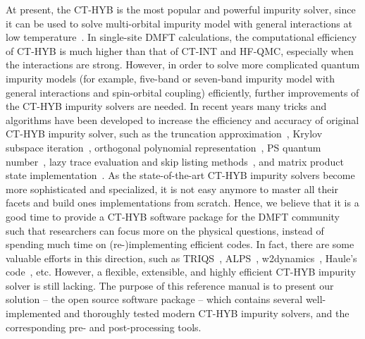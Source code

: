 At present, the CT-HYB is the most popular and powerful impurity solver, since it can be used to solve multi-orbital impurity model with general interactions at low temperature~\cite{RevModPhys.83.349}. In single-site DMFT calculations, the computational efficiency of CT-HYB is much higher than that of CT-INT and HF-QMC, especially when the interactions are  strong. However, in order to solve more complicated quantum impurity models (for example, five-band or seven-band impurity model with general interactions and spin-orbital coupling) efficiently, further improvements of the CT-HYB impurity solvers are needed. In recent years many tricks and algorithms have been developed to increase the efficiency and accuracy of original CT-HYB impurity solver, such as the truncation approximation~\cite{PhysRevB.75.155113}, Krylov subspace iteration~\cite{PhysRevB.80.235117}, orthogonal polynomial representation~\cite{PhysRevB.84.075145,PhysRevB.85.205106}, PS quantum number~\cite{PhysRevB.86.155158}, lazy trace evaluation and skip listing methods~\cite{arXiv:1403.7214}, and matrix product state implementation~\cite{1742-5468-2014-6-P06012}. As the state-of-the-art CT-HYB impurity solvers become more sophisticated and specialized, it is not easy anymore to master all their facets and build ones implementations from scratch. Hence, we believe that it is a good time to provide a CT-HYB software package for the DMFT community such that researchers can focus more on the physical questions, instead of spending much time on (re-)implementing efficient codes. In fact, there are some valuable efforts in this direction, such as TRIQS~\cite{triqs}, ALPS~\cite{1742-5468-2011-05-P05001}, w2dynamics~\cite{w2dynamics}, Haule's code~\cite{haule}, etc. However, a flexible, extensible, and highly efficient CT-HYB impurity solver is still lacking. The purpose of this reference manual is to present our solution -- the open source software package {\iqist} -- which contains several well-implemented and thoroughly tested modern CT-HYB impurity solvers, and the corresponding pre- and post-processing tools.

